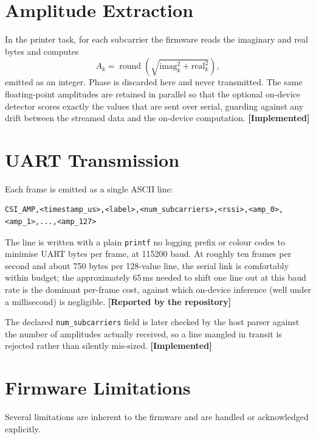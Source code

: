 \documentclass[11pt,a4paper,oneside]{report}
\newcommand{\evidencetag}[2]{{\small\sffamily\bfseries\textcolor{#1}{[#2]}}}
\newcommand{\Impl}{\evidencetag{good}{Implemented}}
\newcommand{\Repo}{\evidencetag{neutralgrey}{Reported by the repository}}
\newcommand{\code}[1]{\texttt{\small #1}}
\begin{document}
\section{Amplitude Extraction}

In the printer task, for each subcarrier the firmware reads the imaginary and
real bytes and computes
\begin{equation}
  A_k = \operatorname{round}\!\left(\sqrt{\mathrm{imag}_k^2 + \mathrm{real}_k^2}\right),
\end{equation}
emitted as an integer. Phase is discarded here and never transmitted. The same
floating-point amplitudes are retained in parallel so that the optional
on-device detector scores exactly the values that are sent over serial,
guarding against any drift between the streamed data and the on-device
computation. \Impl

\section{UART Transmission}

Each frame is emitted as a single ASCII line:

\begin{lstlisting}[caption={Serial line format emitted by the firmware.}]
CSI_AMP,<timestamp_us>,<label>,<num_subcarriers>,<rssi>,<amp_0>,<amp_1>,...,<amp_127>
\end{lstlisting}

The line is written with a plain \code{printf} no logging prefix or colour
codes to minimise UART bytes per frame, at 115200 baud. At roughly ten
frames per second and about 750 bytes per 128-value line, the serial link is
comfortably within budget; the approximately 65\,ms needed to shift one line out
at this baud rate is the dominant per-frame cost, against which on-device
inference (well under a millisecond) is negligible. \Repo

The declared \code{num\_subcarriers} field is later checked by the host parser
against the number of amplitudes actually received, so a line mangled in
transit is rejected rather than silently mis-sized. \Impl

\section{Firmware Limitations}

Several limitations are inherent to the firmware and are handled or
acknowledged explicitly.
\end{document}
